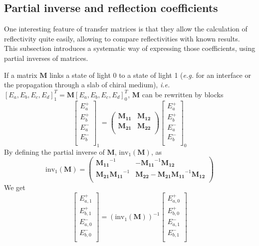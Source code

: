 \subsection{Partial inverse and reflection coefficients}
\label{sec:reflection}
One interesting feature of transfer matrices is that they allow the calculation of reflectivity quite easily, allowing to compare reflectivities with known results\cite{mccall_simplified_2009}. This subsection introduces a systematic way of expressing those coefficients, using partial inverses of matrices\cite{noauthor_partial_2020}.

If a matrix $\bm{M}$ links a state of light 0 to a state of light 1 (\textit{e.g.} for an interface or the propagation through a slab of chiral medium), \textit{i.e.} $\left[E_a, E_b, E_c, E_d\right]^T_{1} = \bm{M}\left[E_a, E_b, E_c, E_d\right]^T_{0}$, $\bm{M}$ can be rewritten by blocks
\begin{equation}
\begin{bmatrix}
E_a^+ \\
E_b^+ \\
E_a^- \\
E_b^- \\
\end{bmatrix}_{1} = \begin{pmatrix}
\bm{M_{11}} & \bm{M_{12}}\\
\bm{M_{21}} & \bm{M_{22}}\\
\end{pmatrix}\begin{bmatrix}
E_a^+ \\
E_b^+ \\
E_a^- \\
E_b^- \\
\end{bmatrix}_{0}
\end{equation}
By defining the partial inverse of $\bm{M}$, $\text{inv}_1(\bm{M})$, as
\begin{equation}
\text{inv}_1(\bm{M}) = \begin{pmatrix}
\bm{M_{11}}^{-1} & -\bm{M_{11}}^{-1}\bm{M_{12}}\\
\bm{M_{21}}\bm{M_{11}}^{-1} & \bm{M_{22}}-\bm{M_{21}}\bm{M_{11}}^{-1}\bm{M_{12}}\\
\end{pmatrix}
\end{equation}
We get
\begin{equation}
\begin{bmatrix}
E_{a,1}^+ \\
E_{b,1}^+ \\
E_{a,0}^- \\
E_{b,0}^- \\
\end{bmatrix} = \left(\text{inv}_1(\bm{M})\right)^{-1}\begin{bmatrix}
E_{a,0}^+ \\
E_{b,0}^+ \\
E_{a,1}^- \\
E_{b,1}^- \\
\end{bmatrix}\label{eq:pinv}
\end{equation}
